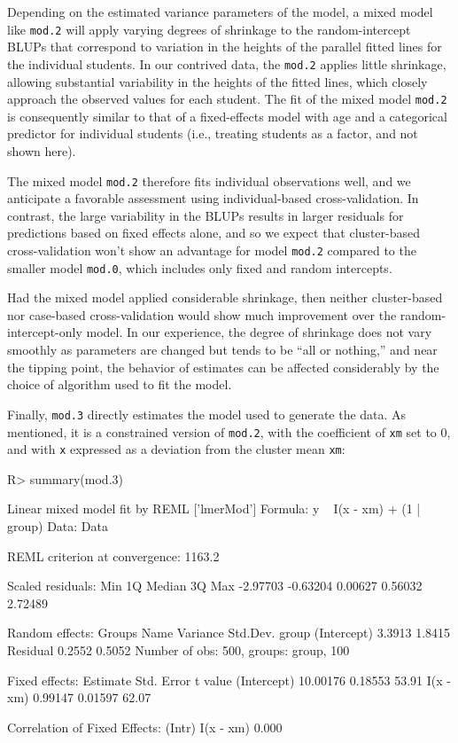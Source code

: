 \documentclass[
]{jss}
\begin{document}
Depending on the estimated variance parameters of the model, a mixed
model like \texttt{mod.2} will apply varying degrees of shrinkage to the
random-intercept BLUPs that correspond to variation in the heights of
the parallel fitted lines for the individual students. In our contrived
data, the \texttt{mod.2} applies little shrinkage, allowing substantial
variability in the heights of the fitted lines, which closely approach
the observed values for each student. The fit of the mixed model
\texttt{mod.2} is consequently similar to that of a fixed-effects model
with age and a categorical predictor for individual students (i.e.,
treating students as a factor, and not shown here).

The mixed model \texttt{mod.2} therefore fits individual observations
well, and we anticipate a favorable assessment using individual-based
cross-validation. In contrast, the large variability in the BLUPs
results in larger residuals for predictions based on fixed effects
alone, and so we expect that cluster-based cross-validation won't show
an advantage for model \texttt{mod.2} compared to the smaller model
\texttt{mod.0}, which includes only fixed and random intercepts.

Had the mixed model applied considerable shrinkage, then neither
cluster-based nor case-based cross-validation would show much
improvement over the random-intercept-only model. In our experience, the
degree of shrinkage does not vary smoothly as parameters are changed but
tends to be ``all or nothing,'' and near the tipping point, the behavior
of estimates can be affected considerably by the choice of algorithm
used to fit the model.

Finally, \texttt{mod.3} directly estimates the model used to generate
the data. As mentioned, it is a constrained version of \texttt{mod.2},
with the coefficient of \texttt{xm} set to 0, and with \texttt{x}
expressed as a deviation from the cluster mean \texttt{xm}:

\begin{CodeChunk}
\begin{CodeInput}
R> summary(mod.3)
\end{CodeInput}
\begin{CodeOutput}
Linear mixed model fit by REML ['lmerMod']
Formula: y ~ I(x - xm) + (1 | group)
   Data: Data

REML criterion at convergence: 1163.2

Scaled residuals: 
     Min       1Q   Median       3Q      Max 
-2.97703 -0.63204  0.00627  0.56032  2.72489 

Random effects:
 Groups   Name        Variance Std.Dev.
 group    (Intercept) 3.3913   1.8415  
 Residual             0.2552   0.5052  
Number of obs: 500, groups:  group, 100

Fixed effects:
            Estimate Std. Error t value
(Intercept) 10.00176    0.18553   53.91
I(x - xm)    0.99147    0.01597   62.07

Correlation of Fixed Effects:
          (Intr)
I(x - xm) 0.000 
\end{CodeOutput}
\end{CodeChunk}
\end{document}
